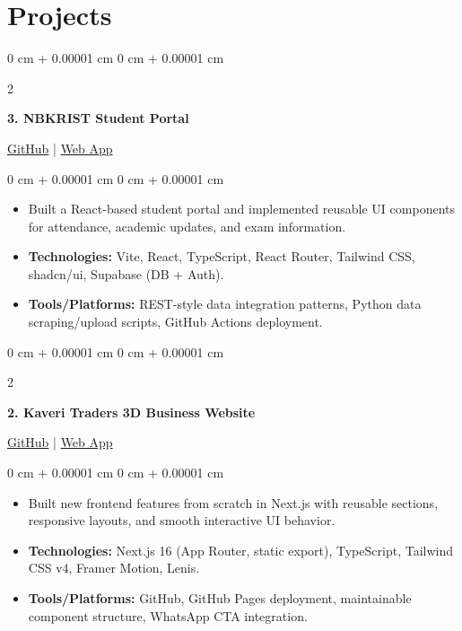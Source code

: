 \documentclass[10pt, a4paper]{article}
\newenvironment{highlights}{
    \begin{itemize}[
        topsep=0.06 cm,
        parsep=0.04 cm,
        partopsep=0pt,
        itemsep=0.02 cm,
        leftmargin=0 cm + 10pt
    ]
}{
    \end{itemize}
}
\newenvironment{onecolentry}{
    \begin{adjustwidth}{
        0 cm + 0.00001 cm
    }{
        0 cm + 0.00001 cm
    }
}{
    \end{adjustwidth}
}
\newenvironment{twocolentry}[2][4.5 cm]{
    \onecolentry
    \def\secondColumn{#2}
    \setcolumnwidth{\fill, #1}
    \begin{paracol}{2}
}{
    \switchcolumn \raggedleft \secondColumn
    \end{paracol}
    \endonecolentry
}
\begin{document}
    \section{Projects}

    \begin{twocolentry}{
        \href{https://github.com/nrenx/nbkrist-student-portal}{GitHub} | \href{https://nbkrstudenthub.me/}{Web App}
    }
        \textbf{3. NBKRIST Student Portal}
    \end{twocolentry}
    \begin{onecolentry}
        \begin{highlights}
            \item Built a React-based student portal and implemented reusable UI components for attendance, academic updates, and exam information.
            \item \textbf{Technologies:} Vite, React, TypeScript, React Router, Tailwind CSS, shadcn/ui, Supabase (DB + Auth).
            \item \textbf{Tools/Platforms:} REST-style data integration patterns, Python data scraping/upload scripts, GitHub Actions deployment.
        \end{highlights}
    \end{onecolentry}

    \vspace{0.2 cm}

    \begin{twocolentry}{
        \href{https://github.com/nrenx/kaveri_traders}{GitHub} | \href{https://nrenx.github.io/kaveri_traders/}{Web App}
    }
        \textbf{2. Kaveri Traders 3D Business Website}
    \end{twocolentry}
    \begin{onecolentry}
        \begin{highlights}
            \item Built new frontend features from scratch in Next.js with reusable sections, responsive layouts, and smooth interactive UI behavior.
            \item \textbf{Technologies:} Next.js 16 (App Router, static export), TypeScript, Tailwind CSS v4, Framer Motion, Lenis.
            \item \textbf{Tools/Platforms:} GitHub, GitHub Pages deployment, maintainable component structure, WhatsApp CTA integration.
        \end{highlights}
    \end{onecolentry}
\end{document}
